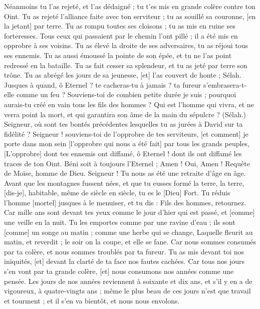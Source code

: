 \begin{multicols}{2}
Néanmoins tu l'as rejeté, et l'as dédaigné ; tu t'es mis en grande colère contre ton Oint.
Tu as rejeté l'alliance faite avec ton serviteur ; tu as souillé sa couronne, [en la jetant] par terre.
Tu as rompu toutes ses cloisons ; tu as mis en ruine ses forteresses.
Tous ceux qui passaient par le chemin l'ont pillé ; il a été mis en opprobre à ses voisins.
Tu as élevé la droite de ses adversaires, tu as réjoui tous ses ennemis.
Tu as aussi émoussé la pointe de son épée, et tu ne l'as point redressé en la bataille.
Tu as fait cesser sa splendeur, et tu as jeté par terre son trône.
Tu as abrégé les jours de sa jeunesse, [et] l'as couvert de honte ; Sélah.
Jusques à quand, ô Eternel ? te cacheras-tu à jamais ? ta fureur s'embrasera-t-elle comme un feu ?
Souviens-toi de combien petite durée je suis ; pourquoi aurais-tu créé en vain tous les fils des hommes ?
Qui est l'homme qui vivra, et ne verra point la mort, et qui garantira son âme de la main du sépulcre ? (Sélah.)
Seigneur, où sont tes bontés précédentes lesquelles tu as jurées à David sur ta fidélité ?
Seigneur ! souviens-toi de l'opprobre de tes serviteurs, [et comment] je porte dans mon sein [l'opprobre qui nous a été fait] par tous les grands peuples,
[L'opprobre] dont tes ennemis ont diffamé, ô Eternel ! dont ils ont diffamé les traces de ton Oint.
Béni soit à toujours l'Eternel ; Amen ! Oui, Amen !
\VerseOne{}Requête de Moïse, homme de Dieu. Seigneur ! Tu nous as été une retraite d'âge en âge.
Avant que les montagnes fussent nées, et que tu eusses formé la terre, la terre, [dis-je], habitable, même de siècle en siècle, tu es le [Dieu] Fort.
Tu réduis l'homme [mortel] jusques à le menuiser, et tu dis : Fils des hommes, retournez.
Car mille ans sont devant tes yeux comme le jour d'hier qui est passé, et [comme] une veille en la nuit.
Tu les emportes comme par une ravine d'eau ; ils sont [comme] un songe au matin ; comme une herbe qui se change,
Laquelle fleurit au matin, et reverdit ; le soir on la coupe, et elle se fane.
Car nous sommes consumés par ta colère, et nous sommes troublés par ta fureur.
Tu as mis devant toi nos iniquités, [et] devant la clarté de ta face nos fautes cachées.
Car tous nos jours s'en vont par ta grande colère, [et] nous consumons nos années comme une pensée.
Les jours de nos années reviennent à soixante et dix ans, et s'il y en a de vigoureux, à quatre-vingts ans ; même le plus beau de ces jours n'est que travail et tourment ; et il s'en va bientôt, et nous nous envolons.

\end{multicols}
